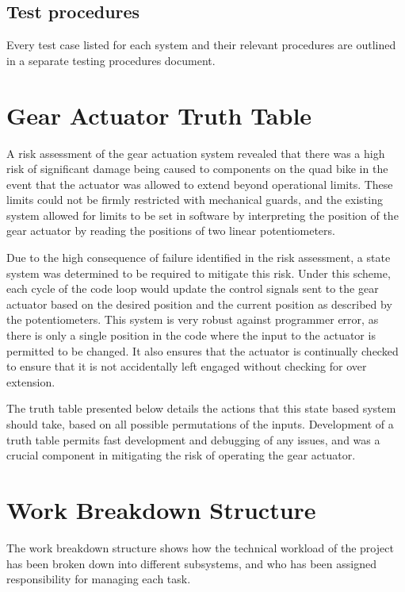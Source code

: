\documentclass[main.tex]{subfiles}
\begin{document}
\begin{appendices}
\section{Test procedures}
Every test case listed for each system and their relevant procedures are outlined in a separate testing procedures document.


\chapter{Gear Actuator Truth Table}

A risk assessment of the gear actuation system revealed that there was a high risk of significant damage being caused to components on the quad bike in the event that the actuator was allowed to extend beyond operational limits. These limits could not be firmly restricted with mechanical guards, and the existing system allowed for limits to be set in software by interpreting the position of the gear actuator by reading the positions of two linear potentiometers. 

Due to the high consequence of failure identified in the risk assessment, a state system was determined to be required to mitigate this risk. Under this scheme, each cycle of the code loop would update the control signals sent to the gear actuator based on the desired position and the current position as described by the potentiometers. This system is very robust against programmer error, as there is only a single position in the code where the input to the actuator is permitted to be changed. It also ensures that the actuator is continually checked to ensure that it is not accidentally left engaged without checking for over extension.

The truth table presented below details the actions that this state based system should take, based on all possible permutations of the inputs. Development of a truth table permits fast development and debugging of any issues, and was a crucial component in mitigating the risk of operating the gear actuator.






\chapter{Work Breakdown Structure}
The work breakdown structure shows how the technical workload of the project has been broken down into different  subsystems, and who has been assigned responsibility for managing each task. 


\end{appendices}
\end{document}
